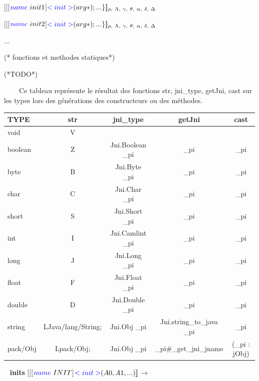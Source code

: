 \documentclass[a4paper, 11pt, notitlepage]{article}
\begin{document}
$[\![$[$ {\color{blue}name}\ init1 $]${\color{blue} <init>} (arg*); ...\}
]\!]_{\rho,\ \Lambda,\ \gamma,\ \theta,\ \alpha,\ \delta,\ \Delta}$

$[\![$[$ {\color{blue}name}\ init2 $]${\color{blue} <init>} (arg*); ...\}
]\!]_{\rho,\ \Lambda,\ \gamma,\ \theta,\ \alpha,\ \delta,\ \Delta}$

...
\begin{OCaml}
(* fonctions et  methodes statiques*)
 
    (*TODO*)

\end{OCaml}


\
\ 
\newline
\ 
\newline
Ce tableau représente le résultat des fonctions str, jni\_type, getJni, cast sur les types lors des générations des constructeurs ou des méthodes.

\noindent
\begin{tabular}{|l|c|c|c|c|}
  \hline
  TYPE & str & jni\_type & getJni & cast \\
  \hline
  void & V & & & \\
  boolean & Z & Jni.Boolean \_pi & \_pi  & \_pi \\
  byte & B & Jni.Byte \_pi & \_pi & \_pi \\
  char & C & Jni.Char \_pi & \_pi & \_pi \\
  short & S & Jni.Short \_pi & \_pi & \_pi  \\
  int & I & Jni.Camlint \_pi & \_pi &  \_pi \\
  long & J & Jni.Long \_pi &\_pi  & \_pi \\
  float & F & Jni.Float \_pi & \_pi & \_pi \\
  double & D & Jni.Double \_pi & \_pi & \_pi \\
  string &LJava/lang/String;& Jni.Obj \_pi & Jni.string\_to\_java \_pi & \_pi \\
  pack/Obj& Lpack/Obj;& Jni.Obj \_pi & \_pi\#\_get\_jni\_jname & (\_pi : jObj) \\
  \hline
\end{tabular}
\ 
\newline
\noindent
\textbf{ inits }
\newline
\noindent
$[\![$[$ {\color{blue}name}\ INIT $]${\color{blue} <init>} (A0,
    A1, ...)]\!]_{}$$\longrightarrow$
\end{document}
